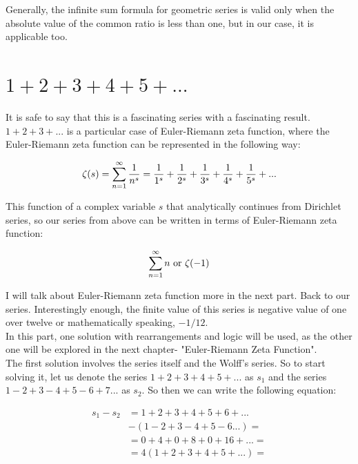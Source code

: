 \documentclass[a4paper]{article}
\begin{document}
Generally, the infinite sum formula for geometric series is valid only when the absolute value
of the common ratio is less than one, but in our case, it is applicable too.
\newpage
\section {$1+2+3+4+5+...$}

It is safe to say that this is a fascinating series with a fascinating result. $1+2+3+...$ is a particular
case of Euler-Riemann zeta function, where the Euler-Riemann zeta function can be represented in
the following way:

\begin{equation}
  \zeta(s)=\sum_{n=1}^{\infty} \frac{1}{n^s}=\frac{1}{1^s}+\frac{1}{2^s}+\frac{1}{3^s}+
  \frac{1}{4^s}+\frac{1}{5^s}+...\\
  \label{zetaf}
\end{equation}

This function of a complex variable $s$ that analytically continues from Dirichlet series, so our series
from above can be written in terms of Euler-Riemann zeta function:

\begin{equation}
  \sum_{n=1}^{\infty} n \text{ or } \zeta(-1)\\
  \end{equation}

I will talk about Euler-Riemann zeta function more in the next part. Back to our series. Interestingly enough,
the finite value of this series is negative value of one over twelve or mathematically speaking,
$-1/12$.\\

In this part, one solution with rearrangements and logic will be used, as the other one will be
explored in the next chapter- "Euler-Riemann Zeta Function".\\

The first solution involves the series itself and the Wolff's series. So to start solving it, let us denote
the series $1+2+3+4+5+...$ as $s_1$ and the series $1-2+3-4+5-6+7...$ as $s_2$. So then
we can write the following equation:

\begin{align*}
  s_1-s_2&=1+2+3+4+5+6+...\\
  &-(1-2+3-4+5-6...)=\\
  &=0+4+0+8+0+16+...=\\
  &=4(1+2+3+4+5+...)=
\end{align*}
\end{document}
